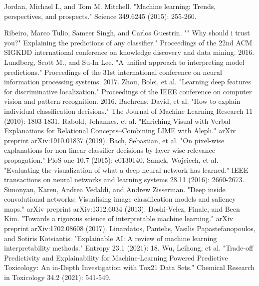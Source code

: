 \documentclass{JMLFS}
\begin{document}

\begin{thebibliography}{99}

Jordan, Michael I., and Tom M. Mitchell. "Machine learning: Trends, perspectives, and prospects." Science 349.6245 (2015): 255-260.

 Ribeiro, Marco Tulio, Sameer Singh, and Carlos Guestrin. "" Why should i trust you?" Explaining the predictions of any classifier." Proceedings of the 22nd ACM SIGKDD international conference on knowledge discovery and data mining. 2016.
 Lundberg, Scott M., and Su-In Lee. "A unified approach to interpreting model predictions." Proceedings of the 31st international conference on neural information processing systems. 2017.
Zhou, Bolei, et al. "Learning deep features for discriminative localization." Proceedings of the IEEE conference on computer vision and pattern recognition. 2016.
 Baehrens, David, et al. "How to explain individual classification decisions." The Journal of Machine Learning Research 11 (2010): 1803-1831.
 Rabold, Johannes, et al. "Enriching Visual with Verbal Explanations for Relational Concepts--Combining LIME with Aleph." arXiv preprint arXiv:1910.01837 (2019).
 Bach, Sebastian, et al. "On pixel-wise explanations for non-linear classifier decisions by layer-wise relevance propagation." PloS one 10.7 (2015): e0130140.
 Samek, Wojciech, et al. "Evaluating the visualization of what a deep neural network has learned." IEEE transactions on neural networks and learning systems 28.11 (2016): 2660-2673.
 Simonyan, Karen, Andrea Vedaldi, and Andrew Zisserman. "Deep inside convolutional networks: Visualising image classification models and saliency maps." arXiv preprint arXiv:1312.6034 (2013).
 Doshi-Velez, Finale, and Been Kim. "Towards a rigorous science of interpretable machine learning." arXiv preprint arXiv:1702.08608 (2017).
 Linardatos, Pantelis, Vasilis Papastefanopoulos, and Sotiris Kotsiantis. "Explainable AI: A review of machine learning interpretability methods." Entropy 23.1 (2021): 18.
 Wu, Leihong, et al. "Trade-off Predictivity and Explainability for Machine-Learning Powered Predictive Toxicology: An in-Depth Investigation with Tox21 Data Sets." Chemical Research in Toxicology 34.2 (2021): 541-549.


\end{thebibliography}
\end{document}
